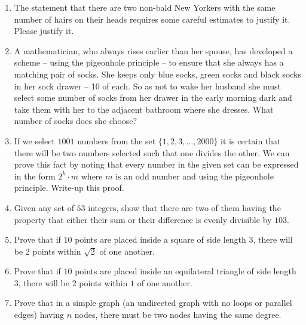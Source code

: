 \begin{enumerate}

\item The statement that there are two non-bald New Yorkers with
the same number of hairs on their heads requires some careful 
estimates to justify it.  Please justify it.

\wbvfill

\item A mathematician, who always rises earlier than her spouse, has
developed a scheme -- using the pigeonhole principle -- to ensure that
she always has a matching pair of socks.  She keeps only blue socks, green 
socks and
black socks in her sock drawer -- 10 of each.  So as not to wake her 
husband she must
select some number of socks from her drawer in the early morning dark
and take them with her to the adjacent bathroom where she dresses.
What number of socks does she choose?

\wbvfill

\workbookpagebreak

\item If we select $1001$ numbers from the set $\{1, 2, 3, \ldots, 2000\}$
it is certain that there will be two numbers selected such that one divides
the other.  We can prove this fact by noting that every number in the given
set can be expressed in the form $2^k \cdot m$ where $m$ is an odd number
and using the pigeonhole principle.  Write-up this proof.

\wbvfill

\item Given any set of $53$ integers, show that there are two of them
having the property 
that either their sum or their difference is evenly divisible by $103$.

\wbvfill

\workbookpagebreak

\item Prove that if $10$ points are placed inside a square of side length 3,
there will be 2 points within $\sqrt{2}$ of one another.

\wbvfill

\item Prove that if $10$ points are placed inside an equilateral triangle
of side length 3, there will be 2 points within $1$ of one another.

\wbvfill

\workbookpagebreak

\item Prove that in a simple graph (an undirected graph with no 
loops or parallel edges) having $n$ nodes, there must be two nodes 
having the same degree. 

\wbvfill

\workbookpagebreak

\end{enumerate}



